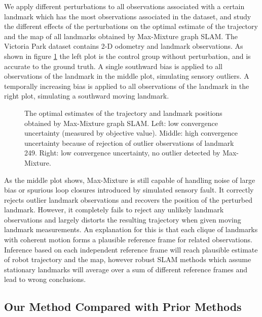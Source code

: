 We apply different perturbations to all observations associated with a certain
landmark which has the most observations associated in the dataset, and study
the different effects of the perturbations on the optimal estimate of the
trajectory and the map of all landmarks obtained by Max-Mixture graph SLAM. The
Victoria Park dataset contains 2-D odometry and landmark observations. As shown
in figure \ref{fig:baseline} the left plot is the control group without
perturbation, and is accurate to the ground truth. A single southward bias is
applied to all observations of the landmark in the middle plot, simulating
sensory outliers. A temporally increasing bias is applied to all observations
of the landmark in the right plot, simulating a southward moving landmark.

\begin{figure}[ht]
\caption{The optimal estimates of the trajectory and landmark positions
obtained by Max-Mixture graph SLAM.  Left: low convergence uncertainty
(measured by objective value). Middle: high convergence uncertainty because of
rejection of outlier observations of landmark 249.  Right: low convergence
uncertainty, no outlier detected by Max-Mixture.}
\label{fig:baseline}
\end{figure}

As the middle plot shows, Max-Mixture is still capable of handling noise of
large bias or spurious loop closures introduced by simulated sensory fault. It
correctly rejects outlier landmark observations and recovers the position of
the perturbed landmark. However, it completely fails to reject any unlikely
landmark observations and largely distorts the resulting trajectory when given
moving landmark measurements. An explanation for this is that each clique of
landmarks with coherent motion forms a plausible reference frame for related
observations. Inference based on each independent reference frame will reach
plausible estimate of robot trajectory and the map, however robust SLAM methods
which assume stationary landmarks will average over a sum of different
reference frames and lead to wrong conclusions.

\subsection{Our Method Compared with Prior Methods}

